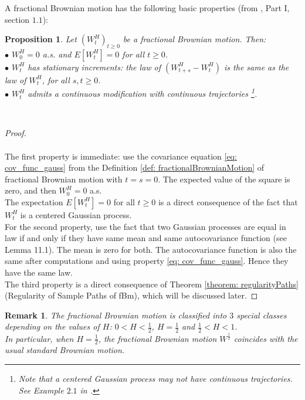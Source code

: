 \documentclass[a4paper,italian,11pt]{book}
\newtheorem{remark}{Remark}
\theoremstyle{plain}
\theoremstyle{remark}
\theoremstyle{plain}
\newtheorem{proposition}{Proposition}
\begin{document}
A fractional Brownian motion has the following basic properties (from \cite{ZhangBook}, Part I, section $1.1$):
\begin{proposition} 
Let $(W^H_t)_{t\ge 0}$ be a fractional Brownian motion. Then:
\\
$\bullet$ $W^H_0 = 0$ a.s. and $E[W^H_t] = 0$ for all $t\ge 0$.
\\
$\bullet$ $W^H_t$ has stationary increments: the law of $\left( W^H_{t+s}-W^H_t \right)$ is the same as the law of $W^H_t$, for all $s,t\ge 0$.
\\
$\bullet$ $W^H_t$ admits a continuous modification with continuous trajectories \footnote{Note that a centered Gaussian process may not have continuous trajectories. See Example $2.1$ in \cite{StevenGaussian}.}.
\end{proposition}
\\
\begin{proof}
\\\
\\
The first property is immediate: use the covariance equation \eqref{eq: cov_func_gauss} from the Definition \ref{def: fractionalBrownianMotion} of fractional Brownian motion with $t=s=0$. The expected value of the square is zero, and then $W^H_0=0$ a.s. \\
The expectation $E[W^H_t]=0$ for all $t\ge 0$ is a direct consequence of the fact that $W^H_t$ is a centered Gaussian process. \\
For the second property, use the fact that two Gaussian processes are equal in law if and only if they have same mean and same autocovariance function (see \cite{lemma11.1} Lemma 11.1). 
The mean is zero for both. The autocovariance function is also the same after computations and using property \eqref{eq: cov_func_gauss}. Hence they have the same law. \\
The third property is a direct consequence of Theorem \ref{theorem: regularityPaths} (Regularity of Sample Paths of fBm), which will be discussed later.

\end{proof}

\begin{remark}
The fractional Brownian motion is classified into $3$ special classes depending on the values of $H$:  $0<H<\frac{1}{2}$, $H=\frac{1}{2}$ and $\frac{1}{2}<H<1$.\\
In particular, when $H=\frac{1}{2}$, the fractional Brownian motion $W^\frac{1}{2}$ coincides with the usual standard Brownian motion.
\end{remark}
\end{document}
